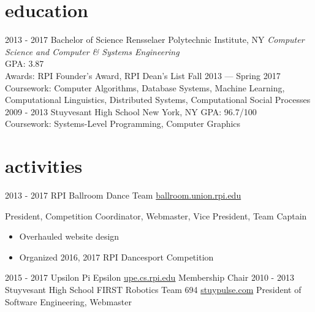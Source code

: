 \documentclass[]{friggeri-cv}
\begin{document}
\section{education}

\begin{entrylist}
  \entry
    {2013 - 2017}
    {Bachelor of Science}
    {Rensselaer Polytechnic Institute, NY}
    {\emph{Computer Science and Computer \& Systems Engineering}\\
    GPA: 3.87\\
    Awards: RPI Founder's Award, RPI Dean's List Fall 2013 --- Spring 2017\\
    Coursework: Computer Algorithms, Database Systems, Machine Learning, Computational Linguistics, Distributed Systems, Computational Social Processes}
  \entry
    {2009 - 2013}
    {Stuyvesant High School}
    {New York, NY}
    {GPA: 96.7/100\\
    Coursework: Systems-Level Programming, Computer Graphics}
\end{entrylist}

\section{activities}

\begin{entrylist}
  \entry
    {2013 - 2017}
    {RPI Ballroom Dance Team}
    {\href{http://ballroom.union.rpi.edu}{ballroom.union.rpi.edu}}
    {President, Competition Coordinator, Webmaster, Vice President, Team Captain
    \begin{itemize}
        \item Overhauled website design
        \item Organized 2016, 2017 RPI Dancesport Competition
    \end{itemize}
    }
  \entry
    {2015 - 2017}
    {Upsilon Pi Epsilon}
    {\href{http://upe.cs.rpi.edu}{upe.cs.rpi.edu}}
    {Membership Chair}
  \entry
    {2010 - 2013}
    {Stuyvesant High School FIRST Robotics Team 694}
    {\href{http://stuypulse.com}{stuypulse.com}}
    {President of Software Engineering, Webmaster}
\end{entrylist}
\end{document}
